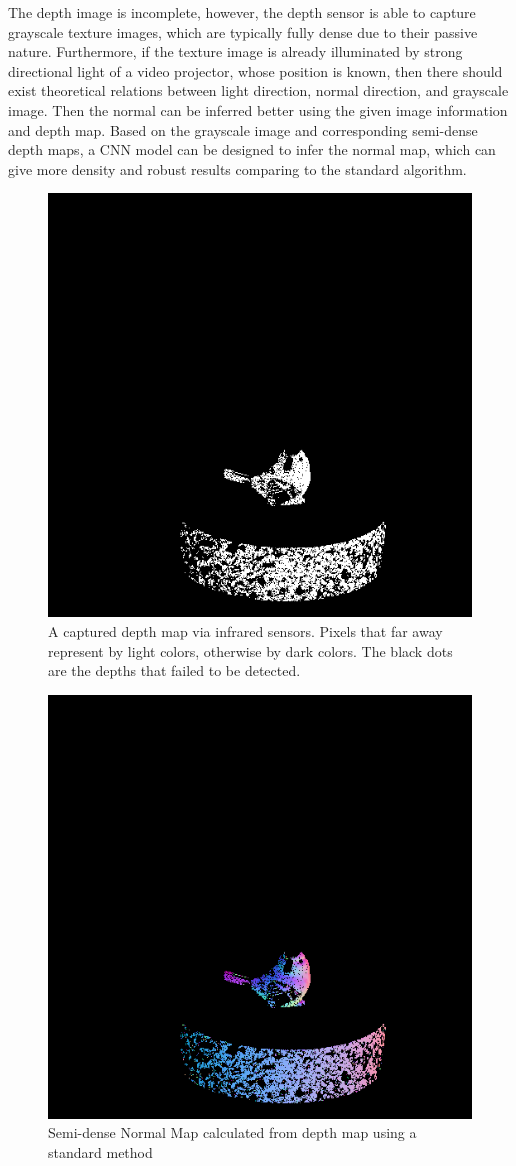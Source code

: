 The depth image is incomplete, however, the depth sensor is able to capture grayscale texture images, which are typically fully dense due to their passive nature. Furthermore, if the texture image is already illuminated by strong directional light of a video projector, whose position is known, then there should exist theoretical relations between light direction, normal direction, and grayscale image. Then the normal can be inferred better using the given image information and depth map.  Based on the grayscale image and corresponding semi-dense depth maps, a CNN model can be designed to infer the normal map, which can give more density and robust results comparing to the standard algorithm. 


\begin{figure}[th]
	\centering
	\includegraphics[width=.4\textwidth]{Figures/kinect-depth.png}
	\decoRule
	\caption{A captured depth map via infrared sensors. Pixels that far away represent by light colors, otherwise by dark colors. The black dots are the depths that failed to be detected.}
\label{fig:kinect-depth}
\end{figure}



\begin{figure}[th]
	\centering
	\includegraphics[width=.4\textwidth]{Figures/real-normal.png}
	\decoRule
	\caption{Semi-dense Normal Map calculated from depth map using a standard method}
\label{fig:standard-normal-inference}
\end{figure}


